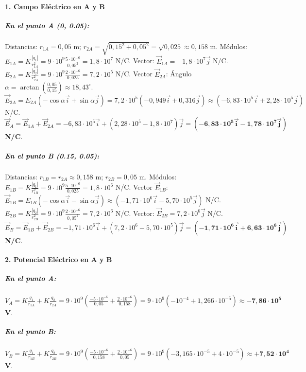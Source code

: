 \paragraph*{1. Campo Eléctrico en A y B}
\subparagraph*{En el punto A (0, 0.05):}
Distancias: $r_{1A} = 0,05$ m; $r_{2A} = \sqrt{0,15^2 + 0,05^2} = \sqrt{0,025} \approx 0,158$ m.
Módulos:
$E_{1A} = K\frac{|q_1|}{r_{1A}^2} = 9\cdot10^9 \frac{5\cdot10^{-6}}{0,05^2} = 1,8 \cdot 10^7$ N/C. Vector: $\vec{E}_{1A} = -1,8 \cdot 10^7 \vec{j}$ N/C.
$E_{2A} = K\frac{|q_2|}{r_{2A}^2} = 9\cdot10^9 \frac{2\cdot10^{-6}}{0,025} = 7,2 \cdot 10^5$ N/C.
Vector $\vec{E}_{2A}$: Ángulo $\alpha = \arctan(\frac{0,05}{0,15}) \approx 18,43^\circ$.
$\vec{E}_{2A} = E_{2A}(-\cos\alpha \vec{i} + \sin\alpha \vec{j}) = 7,2\cdot10^5(-0,949\vec{i} + 0,316\vec{j}) \approx (-6,83\cdot10^5\vec{i} + 2,28\cdot10^5\vec{j})$ N/C.
$\vec{E}_A = \vec{E}_{1A} + \vec{E}_{2A} = -6,83\cdot10^5\vec{i} + (2,28\cdot10^5 - 1,8\cdot10^7)\vec{j} = \boldsymbol{(-6,83\cdot10^5\vec{i} - 1,78\cdot10^7\vec{j})}$ \textbf{N/C}.

\subparagraph*{En el punto B (0.15, 0.05):}
Distancias: $r_{1B} = r_{2A} \approx 0,158$ m; $r_{2B} = 0,05$ m.
Módulos:
$E_{1B} = K\frac{|q_1|}{r_{1B}^2} = 9\cdot10^9 \frac{5\cdot10^{-6}}{0,025} = 1,8 \cdot 10^6$ N/C.
Vector $\vec{E}_{1B}$: $\vec{E}_{1B} = E_{1B}(-\cos\alpha \vec{i} - \sin\alpha \vec{j}) \approx (-1,71\cdot10^6\vec{i} - 5,70\cdot10^5\vec{j})$ N/C.
$E_{2B} = K\frac{|q_2|}{r_{2B}^2} = 9\cdot10^9 \frac{2\cdot10^{-6}}{0,05^2} = 7,2 \cdot 10^6$ N/C. Vector: $\vec{E}_{2B} = 7,2 \cdot 10^6 \vec{j}$ N/C.
$\vec{E}_B = \vec{E}_{1B} + \vec{E}_{2B} = -1,71\cdot10^6\vec{i} + (7,2\cdot10^6 - 5,70\cdot10^5)\vec{j} = \boldsymbol{(-1,71\cdot10^6\vec{i} + 6,63\cdot10^6\vec{j})}$ \textbf{N/C}.

\paragraph*{2. Potencial Eléctrico en A y B}
\subparagraph*{En el punto A:}
$V_A = K\frac{q_1}{r_{1A}} + K\frac{q_2}{r_{2A}} = 9\cdot10^9(\frac{-5\cdot10^{-6}}{0,05} + \frac{2\cdot10^{-6}}{0,158}) = 9\cdot10^9(-10^{-4} + 1,266\cdot10^{-5}) \approx \boldsymbol{-7,86 \cdot 10^5}$ \textbf{V}.

\subparagraph*{En el punto B:}
$V_B = K\frac{q_1}{r_{1B}} + K\frac{q_2}{r_{2B}} = 9\cdot10^9(\frac{-5\cdot10^{-6}}{0,158} + \frac{2\cdot10^{-6}}{0,05}) = 9\cdot10^9(-3,165\cdot10^{-5} + 4\cdot10^{-5}) \approx \boldsymbol{+7,52 \cdot 10^4}$ \textbf{V}.


